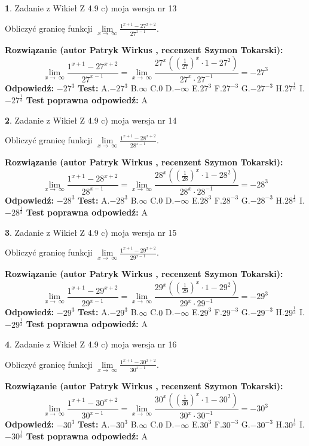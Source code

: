 \documentclass[12pt, a4paper]{article}
\theoremstyle{definition} %
\newtheorem{zad}{}
\newcommand{\zadStart}[1]{\begin{zad}#1\newline}
\newcommand{\zadStop}{\end{zad}}
\newcommand{\rozwStart}[2]{\noindent \textbf{Rozwiązanie (autor #1 , recenzent #2): }\newline}
\newcommand{\rozwStop}{\newline}
\newcommand{\odpStart}{\noindent \textbf{Odpowiedź:}\newline}
\newcommand{\odpStop}{\newline}
\newcommand{\testStart}{\noindent \textbf{Test:}\newline}
\newcommand{\testStop}{\newline}
\newcommand{\kluczStart}{\noindent \textbf{Test poprawna odpowiedź:}\newline}
\newcommand{\kluczStop}{\newline}
\begin{document}
\zadStart{Zadanie z Wikieł Z 4.9 c) moja wersja nr 13}


Obliczyć granicę funkcji  $\lim\limits_{x\to\ \infty}\frac{1^{x+1}-27^{x+2}}{27^{x-1}}$.
\zadStop
\rozwStart{Patryk Wirkus}{Szymon Tokarski}
$$\lim\limits_{x\to\ \infty}\frac{1^{x+1}-27^{x+2}}{27^{x-1}}=\lim\limits_{x\to\ \infty}\frac{27^{x}((\frac{1}{27})^{x}\cdot 1 -27^{2})}{27^{x}\cdot 27^{-1}} = -27^{3}$$
\rozwStop
\odpStart
$-27^{3}$
\odpStop
\testStart
A.$-27^{3}$ B.$\infty$ C.$0$ D.$-\infty$ E.$27^{3}$
F.$27^{-3}$ G.$-27^{-3}$
H.$27^{\frac{1}{3}}$
I.$-27^{\frac{1}{3}}$
\testStop
\kluczStart
A
\kluczStop



\zadStart{Zadanie z Wikieł Z 4.9 c) moja wersja nr 14}


Obliczyć granicę funkcji  $\lim\limits_{x\to\ \infty}\frac{1^{x+1}-28^{x+2}}{28^{x-1}}$.
\zadStop
\rozwStart{Patryk Wirkus}{Szymon Tokarski}
$$\lim\limits_{x\to\ \infty}\frac{1^{x+1}-28^{x+2}}{28^{x-1}}=\lim\limits_{x\to\ \infty}\frac{28^{x}((\frac{1}{28})^{x}\cdot 1 -28^{2})}{28^{x}\cdot 28^{-1}} = -28^{3}$$
\rozwStop
\odpStart
$-28^{3}$
\odpStop
\testStart
A.$-28^{3}$ B.$\infty$ C.$0$ D.$-\infty$ E.$28^{3}$
F.$28^{-3}$ G.$-28^{-3}$
H.$28^{\frac{1}{3}}$
I.$-28^{\frac{1}{3}}$
\testStop
\kluczStart
A
\kluczStop



\zadStart{Zadanie z Wikieł Z 4.9 c) moja wersja nr 15}


Obliczyć granicę funkcji  $\lim\limits_{x\to\ \infty}\frac{1^{x+1}-29^{x+2}}{29^{x-1}}$.
\zadStop
\rozwStart{Patryk Wirkus}{Szymon Tokarski}
$$\lim\limits_{x\to\ \infty}\frac{1^{x+1}-29^{x+2}}{29^{x-1}}=\lim\limits_{x\to\ \infty}\frac{29^{x}((\frac{1}{29})^{x}\cdot 1 -29^{2})}{29^{x}\cdot 29^{-1}} = -29^{3}$$
\rozwStop
\odpStart
$-29^{3}$
\odpStop
\testStart
A.$-29^{3}$ B.$\infty$ C.$0$ D.$-\infty$ E.$29^{3}$
F.$29^{-3}$ G.$-29^{-3}$
H.$29^{\frac{1}{3}}$
I.$-29^{\frac{1}{3}}$
\testStop
\kluczStart
A
\kluczStop



\zadStart{Zadanie z Wikieł Z 4.9 c) moja wersja nr 16}


Obliczyć granicę funkcji  $\lim\limits_{x\to\ \infty}\frac{1^{x+1}-30^{x+2}}{30^{x-1}}$.
\zadStop
\rozwStart{Patryk Wirkus}{Szymon Tokarski}
$$\lim\limits_{x\to\ \infty}\frac{1^{x+1}-30^{x+2}}{30^{x-1}}=\lim\limits_{x\to\ \infty}\frac{30^{x}((\frac{1}{30})^{x}\cdot 1 -30^{2})}{30^{x}\cdot 30^{-1}} = -30^{3}$$
\rozwStop
\odpStart
$-30^{3}$
\odpStop
\testStart
A.$-30^{3}$ B.$\infty$ C.$0$ D.$-\infty$ E.$30^{3}$
F.$30^{-3}$ G.$-30^{-3}$
H.$30^{\frac{1}{3}}$
I.$-30^{\frac{1}{3}}$
\testStop
\kluczStart
A
\kluczStop
\end{document}
